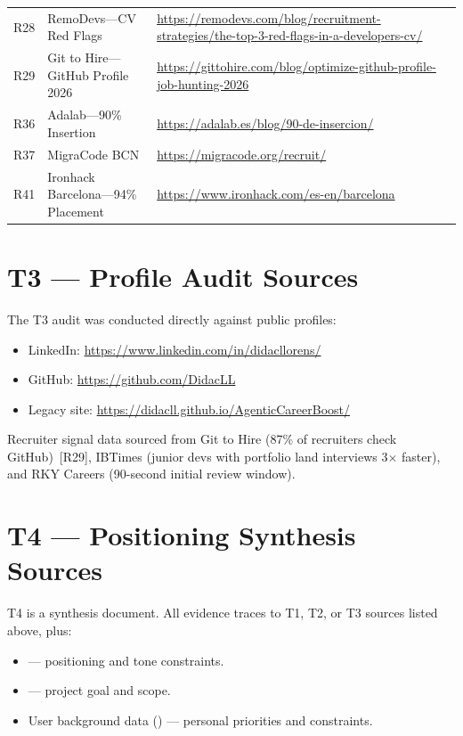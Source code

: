 \documentclass[a4paper,11pt,openany]{report}
\begin{document}
{\begin{longtable}{l p{5cm} p{6.5cm}}
R28 & RemoDevs---CV Red Flags & \url{https://remodevs.com/blog/recruitment-strategies/the-top-3-red-flags-in-a-developers-cv/} \\
R29 & Git to Hire---GitHub Profile 2026 & \url{https://gittohire.com/blog/optimize-github-profile-job-hunting-2026} \\
R36 & Adalab---90\% Insertion & \url{https://adalab.es/blog/90-de-insercion/} \\
R37 & MigraCode BCN & \url{https://migracode.org/recruit/} \\
R41 & Ironhack Barcelona---94\% Placement & \url{https://www.ironhack.com/es-en/barcelona} \\
\bottomrule
\end{longtable}
}

\section{T3 --- Profile Audit Sources}

The T3 audit was conducted directly against public profiles:
\begin{itemize}
  \item LinkedIn: \url{https://www.linkedin.com/in/didacllorens/}
  \item GitHub: \url{https://github.com/DidacLL}
  \item Legacy site: \url{https://didacll.github.io/AgenticCareerBoost/}
\end{itemize}

Recruiter signal data sourced from Git to Hire (87\% of recruiters check
GitHub)~[R29], IBTimes (junior devs with portfolio land interviews
3$\times$ faster), and RKY Careers (90-second initial review window).

\section{T4 --- Positioning Synthesis Sources}

T4 is a synthesis document. All evidence traces to T1, T2, or T3 sources
listed above, plus:
\begin{itemize}
  \item {} --- positioning and tone constraints.
  \item {} --- project goal and scope.
  \item User background data () --- personal priorities
    and constraints.
\end{itemize}
\end{document}
